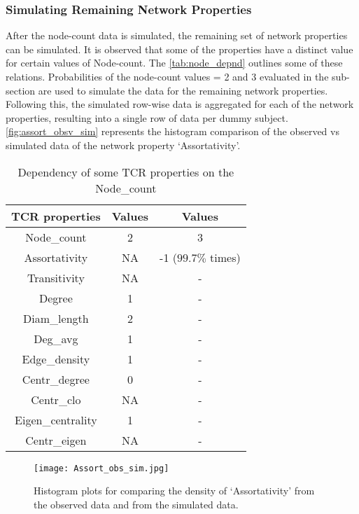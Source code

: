 \subsubsection{Simulating Remaining Network Properties} \label{subsubsection:sim_rem}
After the node-count data is simulated, the remaining set of network properties can be simulated. It is observed that some of the properties have a distinct value for certain values of Node-count. The \autoref{tab:node_depnd} outlines some of these relations. Probabilities of the node-count values = 2 and 3 evaluated in the  sub-section are used to simulate the data for the remaining network properties. Following this, the simulated row-wise data is aggregated for each of the network properties, resulting into a single row of data per dummy subject. \autoref{fig:assort_obsv_sim} represents the histogram comparison of the observed vs simulated data of the network property \lq Assortativity'.\par
\begin{table}[H]\centering
\caption{Dependency of some TCR properties on the Node\_count}
\begin{tabular}{|c|c|c|}\hline
\cellcolor[HTML]{D9E1F2}\textbf{TCR properties} & \cellcolor[HTML]{D9E1F2}\textbf{Values}  & \cellcolor[HTML]{D9E1F2}\textbf{Values} \\ \hline
\cellcolor[HTML]{EAEAEA}Node\_count  & \cellcolor[HTML]{EAEAEA}2 & \cellcolor[HTML]{EAEAEA}3 \\ \hline
Assortativity  & NA & -1 ($99.7\%$ times) \\ 
Transitivity  & NA & - \\ 
Degree  & 1 & - \\ 
Diam\_length  & 2 & - \\
Deg\_avg  & 1 & - \\ 
Edge\_density  & 1 & - \\ 
Centr\_degree  & 0 &  -\\ 
Centr\_clo  & NA & - \\ 
Eigen\_centrality  & 1 & - \\ 
Centr\_eigen  & NA & -\\ \hline
\end{tabular}
\label{tab:node_depnd}
\end{table}
\begin{figure}[H]
\centering
\texttt{[image: Assort\_obs\_sim.jpg]}
\caption{Histogram plots for comparing the density of \lq Assortativity' from the observed data and from the simulated data.}
\label{fig:assort_obsv_sim}
\end{figure}

